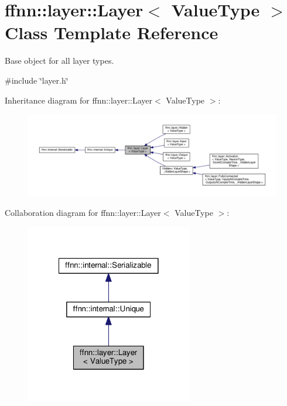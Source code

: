 \hypertarget{classffnn_1_1layer_1_1_layer}{\section{ffnn\-:\-:layer\-:\-:Layer$<$ Value\-Type $>$ Class Template Reference}
\label{classffnn_1_1layer_1_1_layer}
}


Base object for all layer types.  




{\ttfamily \#include \char`\"{}layer.\-h\char`\"{}}



Inheritance diagram for ffnn\-:\-:layer\-:\-:Layer$<$ Value\-Type $>$\-:\nopagebreak
\begin{figure}[H]
\begin{center}
\leavevmode
\includegraphics[width=350pt]{classffnn_1_1layer_1_1_layer__inherit__graph}
\end{center}
\end{figure}


Collaboration diagram for ffnn\-:\-:layer\-:\-:Layer$<$ Value\-Type $>$\-:\nopagebreak
\begin{figure}[H]
\begin{center}
\leavevmode
\includegraphics[width=206pt]{classffnn_1_1layer_1_1_layer__coll__graph}
\end{center}
\end{figure}
